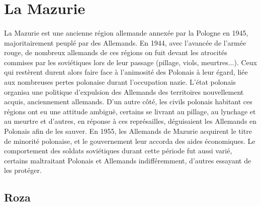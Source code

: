 \documentclass[12pt]{amsart}
\begin{document}
\section{La Mazurie}
\paragraph{}
La Mazurie est une ancienne région allemande annexée par la Pologne en 1945, majoritairement peuplé par des Allemands. En 1944, avec l'avancée de l'armée rouge, de nombreux allemands de ces régions on fuit devant les atrocités commises par les soviétiques lors de leur passage (pillage, viols, meurtres...). Ceux qui restèrent durent alors faire face à l'animosité des Polonais à leur égard, liée aux nombreuses pertes polonaise durant l'occupation nazie. L'état polonais organisa une politique d'expulsion des Allemands des territoires nouvellement acquis, anciennement allemands. D'un autre côté, les civils polonais habitant ces régions ont eu une attitude ambiguë, certains se livrant au pillage, au lynchage et au meurtre et d'autres, en réponse à ces représailles, déguisaient les Allemands en Polonais afin de les sauver. En 1955, les Allemands de Mazurie acquirent le titre de minorité polonaise, et le gouvernement leur accorda des aides économiques. Le comportement des soldats soviétiques durant cette période fut aussi varié, certains maltraitant Polonais et Allemands indifféremment, d'autres essayant de les protéger.
\subsection*{Roza}
\end{document}
